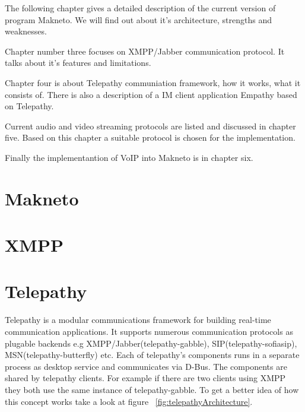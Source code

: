 The following chapter gives a detailed description of the current version of program Makneto. We will find out about it's architecture, strengths and weaknesses. 

Chapter number three focuses on XMPP/Jabber communication protocol. It talks about it's features and limitations. 

Chapter four is about Telepathy communiation framework, how it works, what it consists of. There is also a description of a IM client application Empathy based on Telepathy. 

Current audio and video streaming protocols are listed and discussed in chapter five. Based on this chapter a suitable protocol is chosen for the implementation.

Finally the implementantion of VoIP into Makneto is in chapter six.  


\chapter{Makneto}


\chapter{XMPP}


\chapter{Telepathy}
Telepathy is a modular communications framework for building real-time communication applications. It supports numerous communication protocols as plugable backends e.g XMPP/Jabber(telepathy-gabble), SIP(telepathy-sofiasip), MSN(telepathy-butterfly) etc. Each of telepathy's components runs in a separate process as desktop service and communicates via D-Bus. The components are shared by telepathy clients. For example if there are two clients using XMPP they both use the same instance of telepathy-gabble. To get a better idea of how this concept works take a look at figure ~\ref{fig:telepathyArchitecture}.\cite{TPWiki} 

